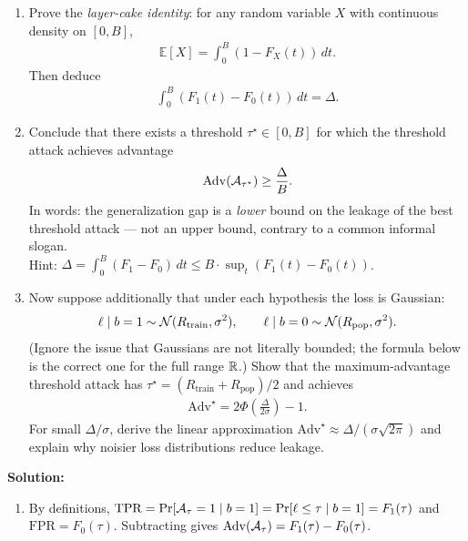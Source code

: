 \documentclass[12pt]{article}
\renewcommand{\fE}{\mathbb{E}}
\begin{document}
\begin{enumerate}
\begin{enumerate}
    \item Prove the \emph{layer-cake identity}: for any random variable $X$ with continuous density on $[0, B]$,
    \begin{align*}
        \fE[X] = \int_0^B (1 - F_X(t))\,dt.
    \end{align*}
    Then deduce
    \begin{align*}
        \int_0^B (F_1(t) - F_0(t))\,dt = \Delta.
    \end{align*}

    \item Conclude that there exists a threshold $\tau^\star \in [0, B]$ for which the threshold attack achieves advantage
    \begin{align*}
        \mathrm{Adv}({\cal A}_{\tau^\star}) \ge \frac{\Delta}{B}.
    \end{align*}
    In words: the generalization gap is a \emph{lower} bound on the leakage of the best threshold attack --- not an upper bound, contrary to a common informal slogan.\\
    Hint: $\Delta = \int_0^B (F_1 - F_0)\,dt \le B \cdot \sup_t (F_1(t) - F_0(t))$.

    \item Now suppose additionally that under each hypothesis the loss is Gaussian:
    \begin{align*}
        \ell \mid b=1 \sim {\cal N}(R_{\mathrm{train}}, \sigma^2), \qquad \ell \mid b=0 \sim {\cal N}(R_{\mathrm{pop}}, \sigma^2).
    \end{align*}
    (Ignore the issue that Gaussians are not literally bounded; the formula below is the correct one for the full range $\mathbb{R}$.) Show that the maximum-advantage threshold attack has $\tau^\star = (R_{\mathrm{train}} + R_{\mathrm{pop}})/2$ and achieves
    \begin{align*}
        \mathrm{Adv}^\star = 2\Phi\!\left(\frac{\Delta}{2\sigma}\right) - 1.
    \end{align*}
    For small $\Delta/\sigma$, derive the linear approximation $\mathrm{Adv}^\star \approx \Delta/(\sigma\sqrt{2\pi})$ and explain why noisier loss distributions reduce leakage.
\end{enumerate}

\begin{solution}
{\bf Solution:}\\
\begin{enumerate}
    \item By definitions, $\mathrm{TPR} = \Pr[{\cal A}_\tau = 1 \mid b = 1] = \Pr[\ell \le \tau \mid b = 1] = F_1(\tau)$ and $\mathrm{FPR} = F_0(\tau)$. Subtracting gives $\mathrm{Adv}({\cal A}_\tau) = F_1(\tau) - F_0(\tau)$.


\end{enumerate}
\end{solution}
\end{enumerate}
\end{document}
